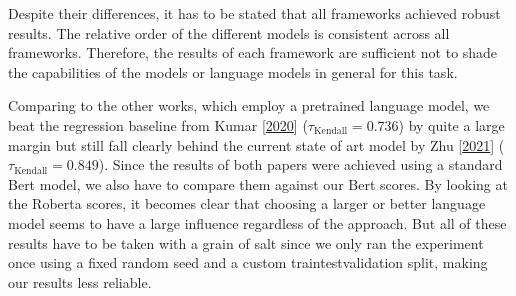 \documentclass[letterpaper,10pt,english]{jupyterBook}
\begin{document}
\sphinxAtStartPar
Despite their differences, it has to be stated that all frameworks achieved robust results.
The relative order of the different models is consistent across all frameworks. Therefore, the results of each framework are sufficient not to shade the capabilities of the models or language models in general for this task.

\sphinxAtStartPar
Comparing to the other works, which employ a pretrained language model, we beat the regression baseline from Kumar  {[}\hyperlink{cite.Bibliography:id9}{2020}{]} (\(\tau_{\textrm{Kendall}}=0.736\)) by quite a large margin but still fall clearly behind the current state of art model by Zhu  {[}\hyperlink{cite.Bibliography:id7}{2021}{]} (\(\tau_{\textrm{Kendall}}=0.849\)). Since the results of both papers were achieved using a standard Bert model, we also have to compare them against our Bert scores. By looking at the Roberta scores, it becomes clear that choosing a larger or better language model seems to have a large influence regardless of the approach. But all of these results have to be taken with a  grain of salt since we only ran the experiment once using a fixed random seed and a custom train\sphinxhyphen{}test\sphinxhyphen{}validation split, making our results less reliable.
\end{document}
